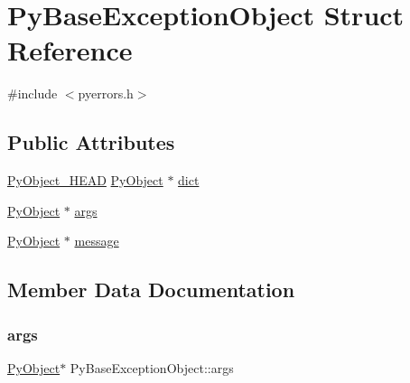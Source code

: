 \hypertarget{struct_py_base_exception_object}{}\section{Py\+Base\+Exception\+Object Struct Reference}
\label{struct_py_base_exception_object}


{\ttfamily \#include $<$pyerrors.\+h$>$}

\subsection*{Public Attributes}
\begin{DoxyCompactItemize}
\item 
\mbox{\hyperlink{_python27_2object_8h_a0bf35c1f3ea13f925de94d8593db3b7e}{Py\+Object\+\_\+\+H\+E\+AD}} \mbox{\hyperlink{_python27_2object_8h_aadc84ac7aed2cfa6f20c25f62bf3dac7}{Py\+Object}} $\ast$ \mbox{\hyperlink{struct_py_base_exception_object_a5e62f1ac7d915523f0a4792bde1ea4a8}{dict}}
\item 
\mbox{\hyperlink{_python27_2object_8h_aadc84ac7aed2cfa6f20c25f62bf3dac7}{Py\+Object}} $\ast$ \mbox{\hyperlink{struct_py_base_exception_object_acb8b6dfa73688e93f7c38f2a66941bbf}{args}}
\item 
\mbox{\hyperlink{_python27_2object_8h_aadc84ac7aed2cfa6f20c25f62bf3dac7}{Py\+Object}} $\ast$ \mbox{\hyperlink{struct_py_base_exception_object_a5e7baef5d9095bf3ba9f534521843a43}{message}}
\end{DoxyCompactItemize}


\subsection{Member Data Documentation}
\mbox{\label{struct_py_base_exception_object_acb8b6dfa73688e93f7c38f2a66941bbf}} 
\subsubsection{\texorpdfstring{args}{args}}
{\footnotesize\ttfamily \mbox{\hyperlink{_python27_2object_8h_aadc84ac7aed2cfa6f20c25f62bf3dac7}{Py\+Object}}$\ast$ Py\+Base\+Exception\+Object\+::args}

\mbox{\label{struct_py_base_exception_object_a5e62f1ac7d915523f0a4792bde1ea4a8}} 
